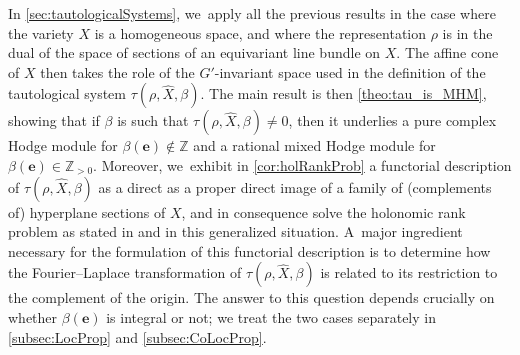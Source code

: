 \documentclass[JEP,XML,SOM,Unicode,published]{cedram}
\let\mathds\mathbb
\newcommand{\bme}{{\boldsymbol{e}}}
\newcommand{\dZ}{{\mathds Z}}\let\mbz\dZ\let\Z\dZ
\begin{document}
In \cref{sec:tautologicalSystems}, we~apply all the previous results in the case where the variety $X$ is a homogeneous space, and where the representation $\rho$ is in the dual of the space of sections of an equivariant line bundle on $X$. The affine cone of $X$ then takes the role of the $G'$-invariant space used in the definition of the tautological system $\tau(\rho,\hat{X},\beta)$. The main result is then \cref{theo:tau_is_MHM}, showing that if $\beta$ is such that $\tau(\rho,\hat{X},\beta)\neq 0$, then it underlies a pure complex Hodge module for $\beta(\bme)\notin \dZ$ and a rational mixed Hodge module for $\beta(\bme)\in \dZ_{>0}$. Moreover, we~exhibit in \cref{cor:holRankProb} a functorial description of $\tau(\rho,\hat{X},\beta)$ as a
direct \resp as a proper direct image of a family of (complements of) hyperplane sections of $X$, and in consequence solve the holonomic rank problem as stated in \cite{Bloch_HolRankProb} and \cite{HuangLianZhu} in this generalized situation. A~major ingredient necessary for the formulation of this functorial description is to determine how the Fourier--Laplace transformation of $\tau(\rho,\hat{X},\beta)$ is related to its restriction to the complement of the origin. The answer to this question depends crucially on whether $\beta(\bme)$ is integral or not; we treat the two cases separately in \cref{subsec:LocProp} and \cref{subsec:CoLocProp}.
\end{document}
